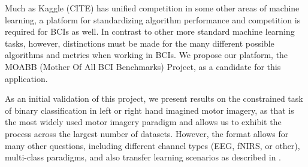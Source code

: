 Much as Kaggle (CITE) has unified competition in some other areas of machine
learning, a platform for standardizing algorithm performance and competition is
required for BCIs as well. In contrast to other more standard machine learning
tasks, however, distinctions must be made for the many different possible
algorithms and metrics when working in BCIs. We propose our platform, the MOABB
(Mother Of All BCI Benchmarks) Project, as a candidate for this application. 

As an initial validation of this project, we present results on the constrained
task of binary classification in left or right hand imagined motor imagery, as
that is the most widely used motor imagery paradigm and allows us to exhibit the
process across the largest number of datasets. However, the format allows for
many other questions, including different channel types (EEG, fNIRS, or other),
multi-class paradigms, and also transfer learning scenarios as described in
\cite{Jayaram2016}.

